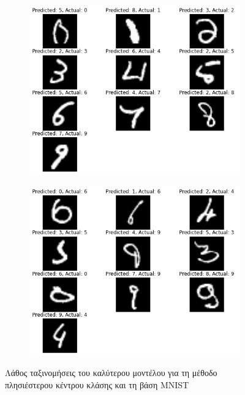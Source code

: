 \documentclass[a4paper]{article}
\begin{document}
\begin{figure}[H]
    \centering

    \begin{subfigure}[t]{0.48\linewidth}
    \includegraphics[width=\linewidth]{mnist/wrong_results_nc_1.png}
    \end{subfigure}
    \begin{subfigure}[t]{0.48\linewidth}
    \includegraphics[width=\linewidth]{mnist/wrong_results_nc_2.png}
    \end{subfigure}

    \caption{Λάθος ταξινομήσεις του καλύτερου μοντέλου για τη μέθοδο
    πλησιέστερου κέντρου κλάσης και τη βάση MNIST}
    \label{fig:mnist_wrong_nc}
\end{figure}
\end{document}
